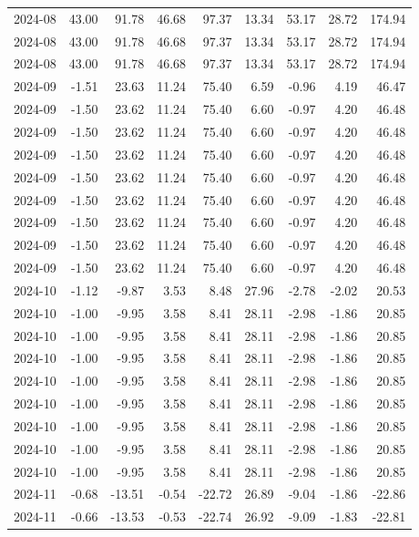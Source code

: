 \begin{table}[ht]
\begin{tabular}{lrrrrrrrr}
  2024-08 & 43.00 & 91.78 & 46.68 & 97.37 & 13.34 & 53.17 & 28.72 & 174.94 \\ 
  2024-08 & 43.00 & 91.78 & 46.68 & 97.37 & 13.34 & 53.17 & 28.72 & 174.94 \\ 
  2024-08 & 43.00 & 91.78 & 46.68 & 97.37 & 13.34 & 53.17 & 28.72 & 174.94 \\ 
  2024-09 & -1.51 & 23.63 & 11.24 & 75.40 & 6.59 & -0.96 & 4.19 & 46.47 \\ 
  2024-09 & -1.50 & 23.62 & 11.24 & 75.40 & 6.60 & -0.97 & 4.20 & 46.48 \\ 
  2024-09 & -1.50 & 23.62 & 11.24 & 75.40 & 6.60 & -0.97 & 4.20 & 46.48 \\ 
  2024-09 & -1.50 & 23.62 & 11.24 & 75.40 & 6.60 & -0.97 & 4.20 & 46.48 \\ 
  2024-09 & -1.50 & 23.62 & 11.24 & 75.40 & 6.60 & -0.97 & 4.20 & 46.48 \\ 
  2024-09 & -1.50 & 23.62 & 11.24 & 75.40 & 6.60 & -0.97 & 4.20 & 46.48 \\ 
  2024-09 & -1.50 & 23.62 & 11.24 & 75.40 & 6.60 & -0.97 & 4.20 & 46.48 \\ 
  2024-09 & -1.50 & 23.62 & 11.24 & 75.40 & 6.60 & -0.97 & 4.20 & 46.48 \\ 
  2024-09 & -1.50 & 23.62 & 11.24 & 75.40 & 6.60 & -0.97 & 4.20 & 46.48 \\ 
  2024-10 & -1.12 & -9.87 & 3.53 & 8.48 & 27.96 & -2.78 & -2.02 & 20.53 \\ 
  2024-10 & -1.00 & -9.95 & 3.58 & 8.41 & 28.11 & -2.98 & -1.86 & 20.85 \\ 
  2024-10 & -1.00 & -9.95 & 3.58 & 8.41 & 28.11 & -2.98 & -1.86 & 20.85 \\ 
  2024-10 & -1.00 & -9.95 & 3.58 & 8.41 & 28.11 & -2.98 & -1.86 & 20.85 \\ 
  2024-10 & -1.00 & -9.95 & 3.58 & 8.41 & 28.11 & -2.98 & -1.86 & 20.85 \\ 
  2024-10 & -1.00 & -9.95 & 3.58 & 8.41 & 28.11 & -2.98 & -1.86 & 20.85 \\ 
  2024-10 & -1.00 & -9.95 & 3.58 & 8.41 & 28.11 & -2.98 & -1.86 & 20.85 \\ 
  2024-10 & -1.00 & -9.95 & 3.58 & 8.41 & 28.11 & -2.98 & -1.86 & 20.85 \\ 
  2024-10 & -1.00 & -9.95 & 3.58 & 8.41 & 28.11 & -2.98 & -1.86 & 20.85 \\ 
  2024-11 & -0.68 & -13.51 & -0.54 & -22.72 & 26.89 & -9.04 & -1.86 & -22.86 \\ 
  2024-11 & -0.66 & -13.53 & -0.53 & -22.74 & 26.92 & -9.09 & -1.83 & -22.81 \\ 

\end{tabular}
\end{table}
